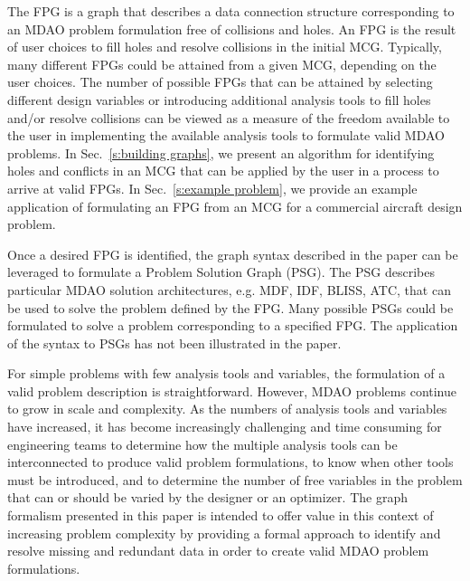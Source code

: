 The FPG is a graph that describes a data connection structure corresponding to an MDAO problem formulation free of collisions and holes. 
An FPG is the result of user choices to fill holes and resolve collisions in the initial MCG. 
Typically, many different FPGs could be attained from a given MCG, depending on the user choices. 
The number of possible FPGs that can be attained by selecting different design variables or introducing additional analysis tools to fill holes and/or resolve collisions can be viewed as a measure of the freedom available to the user in implementing the available analysis tools to formulate valid MDAO problems. 
In Sec.~\ref{s:building graphs}, we present an algorithm for identifying holes and conflicts in an MCG that can be applied by the user in a process to arrive at valid FPGs. 
In Sec.~\ref{s:example problem}, we provide an example application of formulating an FPG from an MCG for a commercial aircraft design problem.

Once a desired FPG is identified, the graph syntax described in the paper can be leveraged to formulate a Problem Solution Graph (PSG). The PSG describes particular MDAO solution architectures, e.g. MDF, IDF, BLISS, ATC, that can be used to solve the problem defined by the FPG. 
Many possible PSGs could be formulated to solve a problem corresponding to a specified FPG.  
The application of the syntax to PSGs has not been illustrated in the paper.

For simple problems with few analysis tools and variables, the formulation of a valid problem description is straightforward. 
However, MDAO problems continue to grow in scale and complexity. 
As the numbers of analysis tools and variables have increased, it has become increasingly challenging and time consuming for engineering teams to determine how the multiple analysis tools can be interconnected to produce valid problem formulations, to know when other tools must be introduced, and to determine the number of free variables in the problem that can or should be varied by the designer or an optimizer. 
The graph formalism presented in this paper is intended to offer value in this context of increasing problem complexity by providing a formal approach to identify and resolve missing and redundant data in order to create valid MDAO problem formulations.  